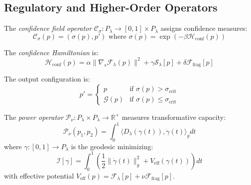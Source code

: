 \subsection{Regulatory and Higher-Order Operators}
\label{subsection:bk6_regulatory_higher_order_operators}

\begin{definition}
\label{definition:bk6_confidence_field_operator}
The \emph{confidence field operator} $\mathcal{C}_\sigma : P_\lambda \to [0,1] \times P_\lambda$ assigns confidence measures:
\begin{equation}
\mathcal{C}_\sigma(p) = (\sigma(p), p') \text{ where } \sigma(p) = \exp(-\beta \mathcal{H}_{\text{conf}}(p))
\end{equation}

The \emph{confidence Hamiltonian} is:
\begin{equation}
\mathcal{H}_{\text{conf}}(p) = \alpha \|\nabla_s \mathcal{F}_\lambda(p)\|^2 + \gamma \mathcal{S}_\lambda[p] + \delta \mathcal{F}_{\text{frag}}[p]
\end{equation}

The output configuration is:
\begin{equation}
p' = \begin{cases}
p & \text{if } \sigma(p) > \sigma_{\text{crit}} \\
\mathcal{G}(p) & \text{if } \sigma(p) \leq \sigma_{\text{crit}}
\end{cases}
\end{equation}
\end{definition}

\begin{definition}
\label{definition:bk6_power_operator}
The \emph{power operator} $\mathcal{P}_\nu : P_\lambda \times P_\lambda \to \mathbb{R}^+$ measures transformative capacity:
\begin{equation}
\mathcal{P}_\nu(p_1, p_2) = \int_0^1 \langle D_\lambda(\gamma(t)), \dot{\gamma}(t) \rangle_g dt
\end{equation}
where $\gamma: [0,1] \to P_\lambda$ is the geodesic minimizing:
\begin{equation}
\mathcal{I}[\gamma] = \int_0^1 \left( \frac{1}{2}\|\dot{\gamma}(t)\|_g^2 + V_{\text{eff}}(\gamma(t)) \right) dt
\end{equation}
with effective potential $V_{\text{eff}}(p) = \mathcal{F}_\lambda[p] + \nu \mathcal{F}_{\text{frag}}[p]$.
\end{definition}

